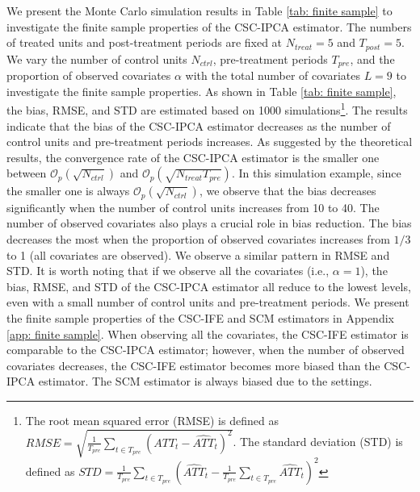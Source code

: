 \documentclass[12pt]{article}
\begin{document}
We present the Monte Carlo simulation results in Table \ref{tab: finite sample} to investigate the finite sample properties of the CSC-IPCA estimator. The numbers of treated units and post-treatment periods are fixed at $N_{treat} = 5$ and $T_{post} = 5$. We vary the number of control units $N_{ctrl}$, pre-treatment periods $T_{pre}$, and the proportion of observed covariates $\alpha$ with the total number of covariates $L = 9$ to investigate the finite sample properties. As shown in Table \ref{tab: finite sample}, the bias, RMSE, and STD are estimated based on 1000 simulations\footnote{The root mean squared error (RMSE) is defined as $RMSE = \sqrt{\frac{1}{T_{pre}} \sum_{t \in T_{pre}} \left(ATT_t - \widehat{ATT}_t \right)^2}$. The standard deviation (STD) is defined as $STD = \frac{1}{T_{pre}} \sum_{t \in T_{pre}} \left(\widehat{ATT}_t - \frac{1}{T_{pre}} \sum_{t \in T_{pre}} \widehat{ATT}_t \right)^2$}. The results indicate that the bias of the CSC-IPCA estimator decreases as the number of control units and pre-treatment periods increases. As suggested by the theoretical results, the convergence rate of the CSC-IPCA estimator is the smaller one between $\mathcal{O}_p\left(\sqrt{N_{ctrl}}\right)$ and $\mathcal{O}_p\left(\sqrt{N_{treat}T_{pre}}\right)$. In this simulation example, since the smaller one is always $\mathcal{O}_p\left(\sqrt{N_{ctrl}}\right)$, we observe that the bias decreases significantly when the number of control units increases from 10 to 40. The number of observed covariates also plays a crucial role in bias reduction. The bias decreases the most when the proportion of observed covariates increases from $1/3$ to 1 (all covariates are observed). We observe a similar pattern in RMSE and STD. It is worth noting that if we observe all the covariates (i.e., $\alpha = 1$), the bias, RMSE, and STD of the CSC-IPCA estimator all reduce to the lowest levels, even with a small number of control units and pre-treatment periods. We present the finite sample properties of the CSC-IFE and SCM estimators in Appendix \ref{app: finite sample}. When observing all the covariates, the CSC-IFE estimator is comparable to the CSC-IPCA estimator; however, when the number of observed covariates decreases, the CSC-IFE estimator becomes more biased than the CSC-IPCA estimator. The SCM estimator is always biased due to the settings.
\end{document}
